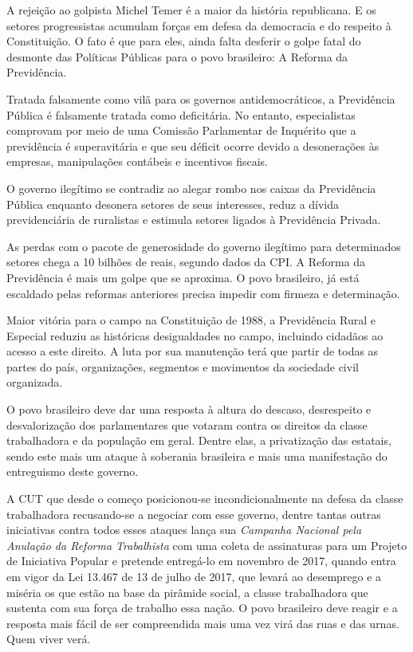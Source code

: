 A rejeição ao golpista Michel Temer é a maior da história republicana. E
os setores progressistas acumulam forças em defesa da democracia e do
respeito à Constituição. O fato é que para eles, ainda falta desferir o
golpe fatal do desmonte das Políticas Públicas para o povo brasileiro: A
Reforma da Previdência.

Tratada falsamente como vilã para os governos antidemocráticos, a
Previdência Pública é falsamente tratada como deficitária. No entanto,
especialistas comprovam por meio de uma Comissão Parlamentar de
Inquérito que a previdência é superavitária e que seu déficit ocorre
devido a desonerações às empresas, manipulações contábeis e incentivos
fiscais.

O governo ilegítimo se contradiz ao alegar rombo nos caixas da
Previdência Pública enquanto desonera setores de seus interesses, reduz
a dívida previdenciária de ruralistas e estimula setores ligados à
Previdência Privada.

As perdas com o pacote de generosidade do governo ilegítimo para
determinados setores chega a 10 bilhões de reais, segundo dados da CPI.
A Reforma da Previdência é mais um golpe que se aproxima. O povo
brasileiro, já está escaldado pelas reformas anteriores precisa impedir
com firmeza e determinação.

Maior vitória para o campo na Constituição de 1988, a Previdência Rural
e Especial reduziu as históricas desigualdades no campo, incluindo
cidadãos ao acesso a este direito. A luta por sua manutenção terá que
partir de todas as partes do país, organizações, segmentos e movimentos
da sociedade civil organizada.

O povo brasileiro deve dar uma resposta à altura do descaso, desrespeito
e desvalorização dos parlamentares que votaram contra os direitos da
classe trabalhadora e da população em geral. Dentre elas, a privatização
das estatais, sendo este mais um ataque à soberania brasileira e mais
uma manifestação do entreguismo deste governo.

A CUT que desde o começo posicionou-se incondicionalmente na defesa da
classe trabalhadora recusando-se a negociar com esse governo, dentre
tantas outras iniciativas contra todos esses ataques lança sua
\emph{Campanha Nacional pela Anulação da Reforma Trabalhista} com uma
coleta de assinaturas para um Projeto de Iniciativa Popular e pretende
entregá-lo em novembro de 2017, quando entra em vigor da Lei 13.467 de
13 de julho de 2017, que levará ao desemprego e a miséria os que estão
na base da pirâmide social, a classe trabalhadora que sustenta com sua
força de trabalho essa nação. O povo brasileiro deve reagir e a resposta
mais fácil de ser compreendida mais uma vez virá das ruas e das urnas.
Quem viver verá.

